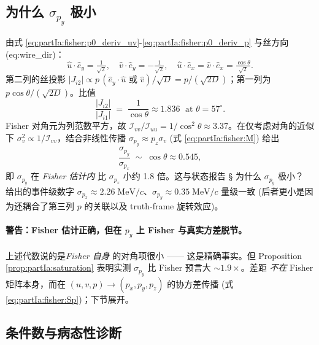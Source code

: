 \subsection{为什么 $\sigma_{p_y}$ 极小}
\label{sec:partIa:fisher:sigmapy}

由式 \eqref{eq:partIa:fisher:p0_deriv_uv}-\eqref{eq:partIa:fisher:p0_deriv_p} 与丝方向 (\StatusReport eq:wire\_dir)：
\begin{equation}
  \hat u\cdot\hat e_y = \tfrac{1}{\sqrt 2},\quad \hat v\cdot\hat e_y = -\tfrac{1}{\sqrt 2},
  \quad
  \hat u\cdot\hat e_x=\hat v\cdot\hat e_x=\tfrac{\cos\theta}{\sqrt 2}.
\end{equation}
第二列的丝投影 $|J_{i2}|\propto p\,(\hat e_y\cdot\hat u\text{ 或 }\hat v)/\sqrt D = p/(\sqrt{2D})$；第一列为 $p\cos\theta/(\sqrt{2D})$。比值
\begin{equation}
  \frac{|J_{i2}|}{|J_{i1}|} \;=\;\frac{1}{\cos\theta}\approx 1.836\;\text{ at }\theta=57^\circ.
\end{equation}
Fisher 对角元为列范数平方，故 $\mathcal I_{vv}/\mathcal I_{uu}=1/\cos^2\theta\approx 3.37$。在仅考虑对角的近似下 $\sigma_v^2\propto 1/\mathcal I_{vv}$，结合非线性传播 $\sigma_{p_y}\approx p_z\sigma_v$ (式 \eqref{eq:partIa:fisher:M}) 给出
\begin{equation}
  \frac{\sigma_{p_y}}{\sigma_{p_x}}\;\sim\;\cos\theta\approx 0.545,
\end{equation}
即 $\sigma_{p_y}$ 在 \emph{Fisher 估计内} 比 $\sigma_{p_x}$ 小约 1.8 倍。这与状态报告 \StatusReport § 为什么 $\sigma_{p_y}$ 极小？ 给出的事件级数字 $\sigma_{p_x}\approx 2.26\;\mathrm{MeV}/c$、$\sigma_{p_y}\approx 0.35\;\mathrm{MeV}/c$ 量级一致 (后者更小是因为还耦合了第三列 $p$ 的关联以及 truth-frame 旋转效应)。

\paragraph{警告：Fisher 估计正确，但在 $p_y$ 上 Fisher 与真实方差脱节。} 上述代数说的是\emph{Fisher 自身} 的对角项很小 —— 这是精确事实。但 Proposition \ref{prop:partIa:saturation} 表明实测 $\sigma_{p_y}$ 比 Fisher 预言大 $\sim 1.9\times$。差距 \emph{不在} Fisher 矩阵本身，而在 $(u,v,p)\to(p_x,p_y,p_z)$ 的协方差传播 (式 \eqref{eq:partIa:fisher:Sp})；下节展开。

\subsection{条件数与病态性诊断}
\label{sec:partIa:fisher:condnum}

